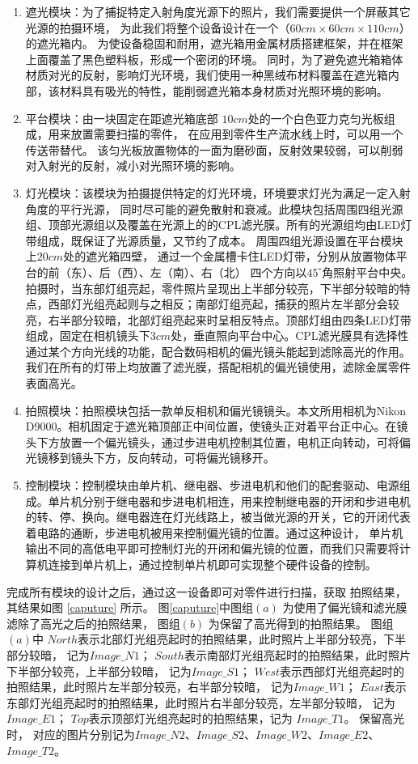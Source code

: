 \begin{enumerate}
\item 遮光模块：为了捕捉特定入射角度光源下的照片，我们需要提供一个屏蔽其它光源的拍摄环境，
为此我们将整个设备设计在一个（$60cm\times 60cm\times 110cm$）的遮光箱内。
为使设备稳固和耐用，遮光箱用金属材质搭建框架，并在框架上面覆盖了黑色塑料板，形成一个密闭的环境。
同时，为了避免遮光箱箱体材质对光的反射，影响灯光环境，我们使用一种黑绒布材料覆盖在遮光箱内部，该材料具有吸光的特性，能削弱遮光箱本身材质对光照环境的影响。
\item
平台模块：由一块固定在距遮光箱底部
$10cm$处的一个白色亚力克匀光板组成，用来放置需要扫描的零件，
在应用到零件生产流水线上时，可以用一个传送带替代。
该匀光板放置物体的一面为磨砂面，反射效果较弱，可以削弱对入射光的反射，减小对光照环境的影响。
\item
灯光模块：该模块为拍摄提供特定的灯光环境，环境要求灯光为满足一定入射角度的平行光源，
同时尽可能的避免散射和衰减。此模块包括周围四组光源组、顶部光源组以及覆盖在光源上的的CPL滤光膜。所有的光源组均由LED灯带组成，既保证了光源质量，又节约了成本。
周围四组光源设置在平台模块上$20cm$处的遮光箱四壁，
通过一个金属槽卡住LED灯带，分别从放置物体平台的前（东）、后（西）、左（南）、右（北）
四个方向以${45}^{\circ}$角照射平台中央。拍摄时，当东部灯组亮起，零件照片呈现出上半部分较亮，下半部分较暗的特点，西部灯光组亮起则与之相反；南部灯组亮起，捕获的照片左半部分会较亮，右半部分较暗，北部灯组亮起来时呈相反特点。顶部灯组由四条LED灯带组成，固定在相机镜头下$3cm$处，垂直照向平台中心。CPL滤光膜具有选择性通过某个方向光线的功能，配合数码相机的偏光镜头能起到滤除高光的作用。我们在所有的灯带上均放置了滤光膜，搭配相机的偏光镜使用，滤除金属零件表面高光。
\item
拍照模块：拍照模块包括一款单反相机和偏光镜镜头。本文所用相机为Nikon D9000。相机固定于遮光箱顶部正中间位置，使镜头正对着平台正中心。在镜头下方放置一个偏光镜头，通过步进电机控制其位置，电机正向转动，可将偏光镜移到镜头下方，反向转动，可将偏光镜移开。
\item
控制模块：控制模块由单片机、继电器、步进电机和他们的配套驱动、电源组成。单片机分别于继电器和步进电机相连，用来控制继电器的开闭和步进电机的转、停、换向。继电器连在灯光线路上，被当做光源的开关，它的开闭代表着电路的通断，步进电机被用来控制偏光镜的位置。通过这种设计，
单片机输出不同的高低电平即可控制灯光的开闭和偏光镜的位置，而我们只需要将计算机连接到单片机上，通过控制单片机即可实现整个硬件设备的控制。
\end{enumerate}

完成所有模块的设计之后，通过这一设备即可对零件进行扫描，获取
拍照结果，其结果如图
\ref{caputure}
所示。
图\ref{caputure}中图组$(a)$
为使用了偏光镜和滤光膜滤除了高光之后的拍照结果，
图组$(b)$
为保留了高光得到的拍照结果。
图组$(a)$中
$North$表示北部灯光组亮起时的拍照结果，此时照片上半部分较亮，下半部分较暗，
记为$Image\_N1$；
$South$表示南部灯光组亮起时的拍照结果，此时照片下半部分较亮，上半部分较暗，
记为$Image\_S1$；
$West$表示西部灯光组亮起时的拍照结果，此时照片左半部分较亮，右半部分较暗，
记为$Image\_W1$；
$East$表示东部灯光组亮起时的拍照结果，此时照片右半部分较亮，左半部分较暗，
记为$Image\_E1$；
$Top$表示顶部灯光组亮起时的拍照结果，记为
$Image\_T1$。
保留高光时，
对应的图片分别记为$Image\_N2$、$Image\_S2$、$Image\_W2$、$Image\_E2$、$Image\_T2$。

